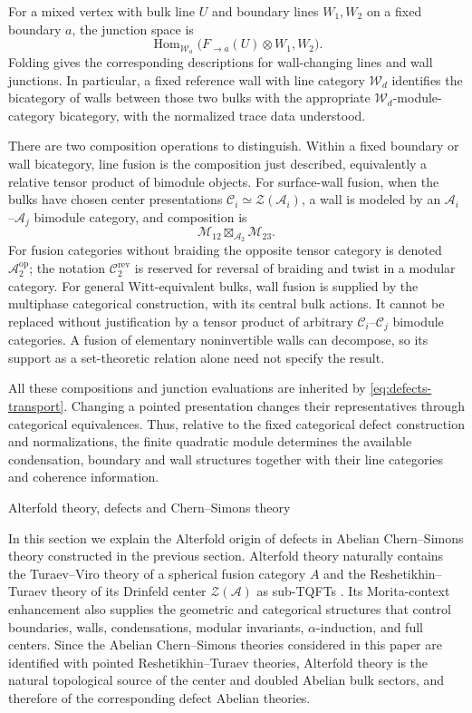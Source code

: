 \documentclass[12pt]{amsart}
\makeatletter
\renewcommand\section{\@startsection{section}{1}%
  \z@{.7\linespacing\@plus\linespacing}{.5\linespacing}%
  {\normalfont\bfseries\centering}}
\numberwithin{equation}{section}
\theoremstyle{definition}
\DeclareMathOperator{\Hom}{Hom}
\makeatother
\begin{document}
For a mixed vertex with bulk line $U$ and boundary lines $W_1,W_2$
on a fixed boundary $a$, the junction space is
$$
\Hom_{\mathcal W_a}
\bigl(F_{\to a}(U)\otimes W_1,W_2\bigr).
$$
Folding gives the corresponding descriptions for wall-changing
lines and wall junctions. In particular, a fixed reference wall
with line category $\mathcal W_d$ identifies the bicategory of
walls between those two bulks with the appropriate
$\mathcal W_d$-module-category bicategory, with the normalized
trace data understood.

There are two composition operations to distinguish. Within a
fixed boundary or wall bicategory, line fusion is the composition
just described, equivalently a relative tensor product of
bimodule objects. For surface-wall fusion, when the bulks have
chosen center presentations
$\mathcal C_i\simeq\mathcal Z(\mathcal A_i)$, a wall is modeled
by an $\mathcal A_i$--$\mathcal A_j$ bimodule category, and
composition is
$$
\mathcal M_{12}\boxtimes_{\mathcal A_2}\mathcal M_{23}.
$$
For fusion categories without braiding the opposite tensor
category is denoted $\mathcal A_2^{\mathrm{op}}$; the notation
$\mathcal C_2^{\mathrm{rev}}$ is reserved for reversal of braiding
and twist in a modular category. For general Witt-equivalent
bulks, wall fusion is supplied by the multiphase categorical
construction, with its central bulk actions. It cannot be
replaced without justification by a tensor product of arbitrary
$\mathcal C_i$--$\mathcal C_j$ bimodule categories. A fusion of
elementary noninvertible walls can decompose, so its support as
a set-theoretic relation alone need not specify the result.

All these compositions and junction evaluations are inherited by
\eqref{eq:defects-transport}. Changing a pointed presentation
changes their representatives through categorical equivalences.
Thus, relative to the fixed categorical defect construction and
normalizations, the finite quadratic module determines the
available condensation, boundary and wall structures together
with their line categories and coherence  information.



\section{Alterfold theory, defects and Chern--Simons theory}
\label{sec:Alterfold}

In this section we explain the Alterfold origin of defects in Abelian Chern--Simons theory constructed in the previous section. Alterfold theory naturally contains the Turaev--Viro theory of a spherical fusion category $A$ and the Reshetikhin--Turaev theory of its Drinfeld center $\mathcal Z(\mathcal A)$ as sub-TQFTs \cite{Alterfold1,Alterfold2}. Its Morita-context enhancement also supplies the geometric and categorical structures that control boundaries, walls, condensations, modular invariants, $\alpha$-induction, and full centers. Since the Abelian Chern--Simons theories considered in this paper are identified with pointed Reshetikhin--Turaev theories, Alterfold theory is the natural topological source of the center and doubled Abelian bulk sectors, and therefore of the corresponding defect Abelian theories.
\end{document}
